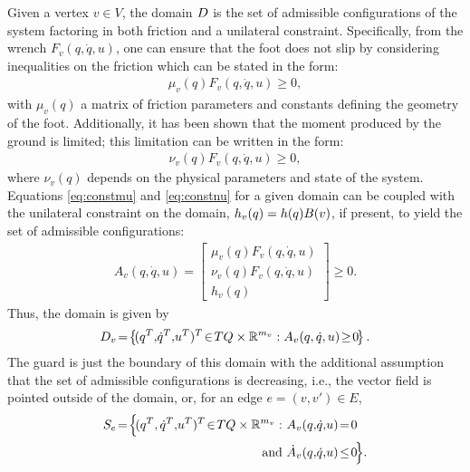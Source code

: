 Given a vertex $v \in V$, the domain $D$ is the set of admissible configurations of the system factoring in both friction and a unilateral constraint. Specifically, from the wrench $F_{v}(q, {\dot q}, u)$, one can ensure that the foot does not slip by considering inequalities on the friction which can be stated in the form:
\begin{align}
  \label{eq:constmu}
  \mu_{v}(q) F_{v}(q, {\dot q}, u) \geq 0,
\end{align}
with $\mu_{v}(q)$ a matrix of friction parameters and constants defining the geometry of the foot.\cite{GCAS10}\xspace Additionally, it has been shown\cite{CBAA09,VBSS90} that the moment produced by the ground is limited; this limitation can be written in the form:
\begin{align}
  \label{eq:constnu}
  \nu_{v}(q) F_{v}(q, {\dot q}, u) \geq 0,
\end{align}
where $\nu_{v}(q)$ depends on the physical parameters and state of the system. Equations \eqref{eq:constmu} and \eqref{eq:constnu} for a given domain can be coupled with the unilateral constraint on the domain, $h_{v}(q) = h(q) B(v)$, if present, to yield the set of admissible configurations:
\begin{align}
  \label{admissible}
  A_{v}(q, {\dot q}, u) = \left[ \begin{array}{c}
      \mu_{v}(q) F_{v}(q, {\dot q}, u)\\
      \nu_{v}(q) F_{v}(q, {\dot q}, u)\\
      h_{v}(q)
    \end{array} \right] \geq 0.
\end{align}
Thus, the domain is given by
\begin{align}
  \label{eq:domain}
  \D_{v} \! = \! \left\{ \! (q^{T}, \! {\dot q}^{T}, \! u^{T})^{T} \! \in \! TQ \times \R^{m_{v}} : A_{v}(q, {\dot q}, u) \! \geq \! 0 \! \right\}.
\end{align}
The guard is just the boundary of this domain with the additional assumption that the set of admissible configurations is decreasing, i.e., the vector field is pointed outside of the domain, or, for an edge $e = (v, v') \in E$,
\begin{align}
  S_{e} \! = \! \Bigl\{ \!(q^{T}, {\dot q}^{T}, \! u^{T})^{T} \! \in \! TQ \times \R^{m_v} : \ &A_{v}(q, \! {\dot q}, \! u) \! = \! 0 \\
  \nonumber
  \mathrm{and} \ &{\dot A}_{v}(q, \! {\dot q}, \! u) \! \leq \! 0 \! \Bigl\}.
\end{align}

